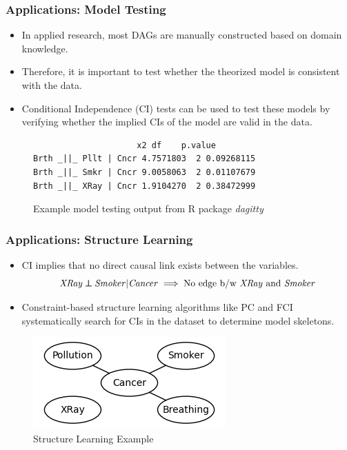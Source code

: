 \documentclass{beamer}
\def\ci{\perp\!\!\!\!\!\perp}
\begin{document}
\begin{frame}[fragile]
	\frametitle{Applications: Model Testing}
	\begin{itemize}
		\item In applied research, most DAGs are manually constructed
			based on domain knowledge.
		\item Therefore, it is important to test whether the theorized model is
			consistent with the data.
		\item Conditional Independence (CI) tests can be used to test
			these models by verifying whether the implied CIs of the model
			are valid in the data.
	\end{itemize}
	\vspace{1em}

	\begin{figure}
		\centering
 		\begin{BVerbatim}
		             x2 df    p.value
Brth _||_ Pllt | Cncr 4.7571803  2 0.09268115
Brth _||_ Smkr | Cncr 9.0058063  2 0.01107679
Brth _||_ XRay | Cncr 1.9104270  2 0.38472999
 		\end{BVerbatim}
		\caption*{Example model testing output from R package \emph{dagitty}}
	\end{figure}
\end{frame}

\begin{frame}
	\frametitle{Applications: Structure Learning}
	\begin{itemize}
		\setlength\itemsep{1em}
		\item CI implies that no direct causal link exists between the variables.
			$$ \text{\emph{XRay}} \ci \text{\emph{Smoker}} | \text{\emph{Cancer}} \implies \text{No edge b/w \emph{XRay} and \emph{Smoker}} $$

		\item Constraint-based structure learning algorithms like PC
			and FCI systematically search for CIs in the dataset to 
			determine model skeletons.
	\end{itemize}
	\begin{figure}
		\centering
		\includegraphics[scale=0.6]{imgs/example_sl.png}
		\caption*{Structure Learning Example}
	\end{figure}
\end{frame}
\end{document}
